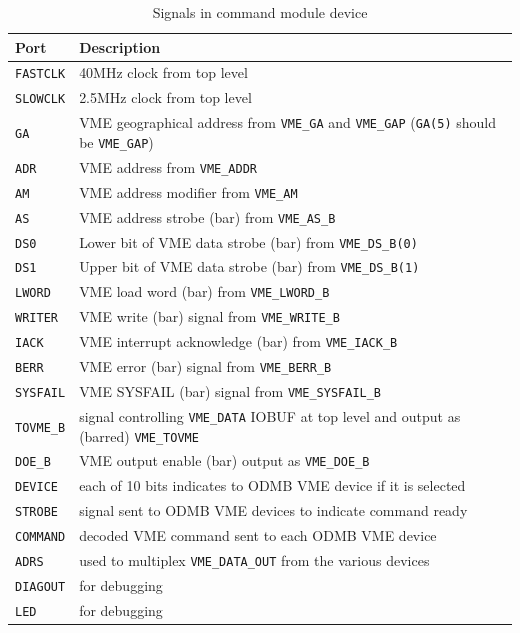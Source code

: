 \documentclass[10pt,a4paper]{article}
\begin{document}
\begin{table}[H]
\begin{tabular}{|l|l|} \hline
Port& Description\\ \hline
\texttt{FASTCLK}& 40MHz clock from top level\\ \hline
\texttt{SLOWCLK}& 2.5MHz clock from top level\\ \hline
\texttt{GA}& VME geographical address from \texttt{VME\_GA} and \texttt{VME\_GAP} (\texttt{GA(5)} should be \texttt{VME\_GAP})\\ \hline
\texttt{ADR}& VME address from \texttt{VME\_ADDR}\\ \hline
\texttt{AM}& VME address modifier from \texttt{VME\_AM}\\ \hline
\texttt{AS}& VME address strobe (bar) from \texttt{VME\_AS\_B}\\ \hline
\texttt{DS0}& Lower bit of VME data strobe (bar) from \texttt{VME\_DS\_B(0)}\\ \hline
\texttt{DS1}& Upper bit of VME data strobe (bar) from \texttt{VME\_DS\_B(1)}\\ \hline
\texttt{LWORD}& VME load word (bar) from \texttt{VME\_LWORD\_B}\\ \hline
\texttt{WRITER}& VME write (bar) signal from \texttt{VME\_WRITE\_B}\\ \hline
\texttt{IACK}& VME interrupt acknowledge (bar) from \texttt{VME\_IACK\_B}\\ \hline
\texttt{BERR}& VME error (bar) signal from \texttt{VME\_BERR\_B}\\ \hline
\texttt{SYSFAIL}& VME SYSFAIL (bar) signal from \texttt{VME\_SYSFAIL\_B}\\ \hline
\texttt{TOVME\_B}& signal controlling \texttt{VME\_DATA} IOBUF at top level and output as (barred) \texttt{VME\_TOVME}\\ \hline
\texttt{DOE\_B}& VME output enable (bar) output as \texttt{VME\_DOE\_B}\\ \hline
\texttt{DEVICE}& each of 10 bits indicates to ODMB VME device if it is selected\\ \hline
\texttt{STROBE}& signal sent to ODMB VME devices to indicate command ready\\ \hline
\texttt{COMMAND}& decoded VME command sent to each ODMB VME device\\ \hline
\texttt{ADRS}& used to multiplex \texttt{VME\_DATA\_OUT} from the various devices\\ \hline
\texttt{DIAGOUT}& for debugging\\ \hline
\texttt{LED}& for debugging\\ \hline
\end{tabular}
\caption{Signals in command module device}
\label{tab:commandinterface}
\end{table}
\end{document}
